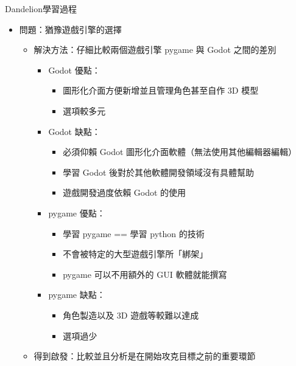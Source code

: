 \documentclass{article}
\begin{document}
\begin{large}
    \begin{boxpar}{Dandelion}{學習過程}
\begin{itemize}
    \item 問題：猶豫遊戲引擎的選擇
        \begin{itemize}
            \item 解決方法：仔細比較兩個遊戲引擎 pygame 與 Godot 之間的差別
                \begin{itemize}
                    \item Godot 優點：
                        \begin{itemize}
                            \item 圖形化介面方便新增並且管理角色甚至自作 3D 模型
                            \item 選項較多元
                        \end{itemize}
                    \item Godot 缺點：
                        \begin{itemize}
                            \item 必須仰賴 Godot 圖形化介面軟體（無法使用其他編輯器編輯）
                            \item 學習 Godot 後對於其他軟體開發領域沒有具體幫助
                            \item 遊戲開發過度依賴 Godot 的使用
                        \end{itemize}
                    \item pygame 優點：
                        \begin{itemize}
                            \item 學習 pygame == 學習 python 的技術
                            \item 不會被特定的大型遊戲引擎所「綁架」
                            \item pygame 可以不用額外的 GUI 軟體就能撰寫
                        \end{itemize}
                    \item pygame 缺點：
                        \begin{itemize}
                            \item 角色製造以及 3D 遊戲等較難以達成
                            \item 選項過少
                        \end{itemize}
                \end{itemize}
            \item 得到啟發：比較並且分析是在開始攻克目標之前的重要環節

\end{itemize}
\end{itemize}
\end{boxpar}
\end{large}
\end{document}
